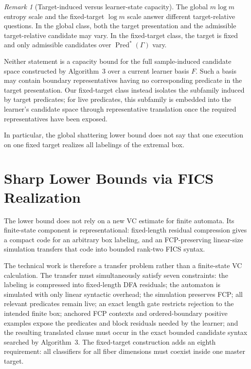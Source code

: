 \documentclass[11pt]{article}
\theoremstyle{definition}
\theoremstyle{remark}
\newtheorem{remark}[theorem]{Remark}
\newcommand{\Pred}{\operatorname{Pred}}
\begin{document}
\begin{remark}[Target-induced versus learner-state capacity]
The global \(m\log m\) entropy scale and the fixed-target \(\log m\) scale
answer different target-relative questions.  In the global class, both the
target presentation and the admissible target-relative candidate may vary.
In the fixed-target class, the target is fixed and only admissible candidates
over \(\Pred^\ast(\Gamma)\) vary.

Neither statement is a capacity bound for the full sample-induced candidate
space constructed by Algorithm~3 over a current learner basis \(F\).  Such a
basis may contain boundary representatives having no corresponding predicate
in the target presentation.  Our fixed-target class instead isolates the
subfamily induced by target predicates; for live predicates, this subfamily
is embedded into the learner's candidate space through representative
translation once the required representatives have been exposed.

In particular, the global shattering lower bound does not say that one
execution on one fixed target realizes all labelings of the extremal box.
\end{remark}

\section{Sharp Lower Bounds via FICS Realization}
\label{sec:lower}

The lower bound does not rely on a new VC estimate for finite automata.
Its finite-state component is representational: fixed-length residual
compression gives a compact code for an arbitrary box labeling, and an
FCP-preserving linear-size simulation transfers that code into bounded
rank-two FICS syntax.

The technical work is therefore a transfer problem rather than a finite-state
VC calculation.  The transfer must simultaneously satisfy seven constraints:
the labeling is compressed into fixed-length DFA residuals; the automaton is
simulated with only linear syntactic overhead; the simulation preserves FCP;
all relevant predicates remain live; an exact length gate restricts rejection
to the intended finite box; anchored FCP contexts and ordered-boundary
positive examples expose the predicates and block residuals needed by the
learner; and the resulting translated clause must occur in the exact bounded
candidate syntax searched by Algorithm~3.  The fixed-target construction adds
an eighth requirement: all classifiers for all fiber dimensions must coexist
inside one master target.
\end{document}
